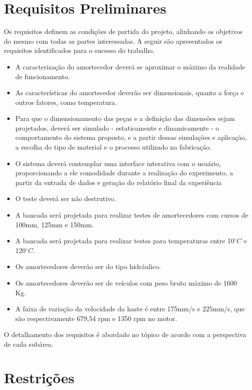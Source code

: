 	\section{Requisitos Preliminares}
	\label{sec:tap_requisitos}

		Os requisitos definem as condições de partida do projeto, alinhando os objetivos do mesmo com todas as partes interessadas. A seguir são apresentados os requisitos identificados para o sucesso do trabalho.

		\begin{itemize}
			\item A caracterização do amortecedor deverá se aproximar o máximo da realidade de funcionamento.
			\item As características do amortecedor deverão ser dimensionais, quanto a força e outros fatores, como temperatura.
			\item Para que o dimensionamento das peças e a definição das dimensões sejam projetados, deverá ser simulado - estaticamente e dinamicamente - o comportamento do sistema proposto, e a partir dessas simulações e aplicação, a escolha do tipo de material e o processo utilizado na fabricação.
			\item O sistema deverá contemplar uma interface interativa com o usuário, proporcionando a ele comodidade durante a realização do experimento, a partir da entrada de dados e geração do relatório final da experiência
			\item O teste deverá ser não destrutivo.
			\item A bancada será projetada para realizar testes de amortecedores com cursos de 100mm, 125mm e 150mm.
			\item A bancada será projetada para realizar testes para temperaturas entre 10$^{\circ}C$ e 120$^{\circ}C$.
			\item Os amortecedores deverão ser do tipo hidráulico.
			\item Os amortecedores deverão ser de veículos com peso bruto máximo de 1600 Kg.
			\item A faixa de variação da velocidade da haste é entre 175mm/s e 225mm/s, que são respectivamente 679,54 rpm e 1350 rpm no motor.
		\end{itemize}

		O detalhamento dos requisitos é abordado no tópico  de acordo com a perspectiva de cada subárea.

	\section{Restrições}
	\label{sec:tap_riscos}


